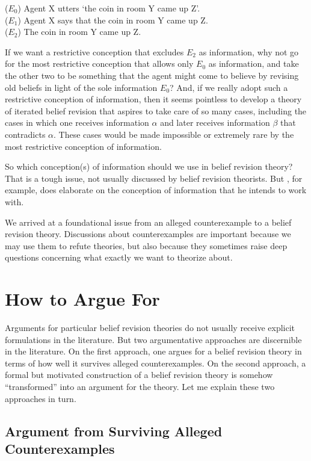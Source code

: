 	\xm ($E_0$) Agent X utters `the coin in room Y came up Z'. 
	\\ ($E_1$) Agent X says that the coin in room Y came up Z.
	\\ ($E_2$) The coin in room Y came up Z.

\ed If we want a restrictive conception that excludes $E_2$ as information, why not go for the most restrictive conception that allows only $E_0$ as information, and take the other two to be something that the agent might come to believe by revising old beliefs in light of the sole information $E_0$? And, if we really adopt such a restrictive conception of information, then it seems pointless to develop a theory of iterated belief revision that aspires to take care of so many cases, including the cases in which one receives information $\alpha$ and later receives information $\beta$ that contradicts $\alpha$. These cases would be made impossible or extremely rare by the most restrictive conception of information. 

So which conception(s) of information should we use in belief revision theory? That is a tough issue, not usually discussed by belief revision theorists. But \citet{gardenfors1988knowledge}, for example, does elaborate on the conception of information that he intends to work with.

We arrived at a foundational issue from an alleged counterexample to a belief revision theory. Discussions about counterexamples are important because we may use them to refute theories, but also because they sometimes raise deep questions concerning what exactly we want to theorize about. 


\section{How to Argue For}\label{sec-argue-for}

Arguments for particular belief revision theories do not usually receive explicit formulations in the literature. But two argumentative approaches are discernible in the literature. On the first approach, one argues for a belief revision theory in terms of how well it survives alleged counterexamples. On the second approach, a formal but motivated construction of a belief revision theory is somehow ``transformed'' into an argument for the theory. Let me explain these two approaches in turn.

\subsection{Argument from Surviving Alleged Counterexamples}

